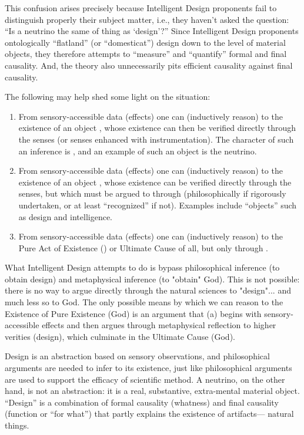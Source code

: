 This confusion arises precisely because Intelligent Design proponents fail to distinguish properly their subject matter, i.e., they haven't asked the question: ``Is a neutrino the same  of thing as `design'?'' Since Intelligent Design proponents ontologically ``flatland'' (or ``domesticat'') design down to the level of material objects, they therefore attempts to ``measure'' and ``quantify'' formal and final causality. And, the theory also unnecessarily pits efficient causality against final causality.

The following may help shed some light on the situation:
\begin{enumerate}
\item From sensory-accessible data (effects) one can  (inductively reason) to the existence of an object , whose existence can then be verified directly through the senses (or senses enhanced with instrumentation). The character of such an inference is , and an example of such an object is the neutrino.
\item From sensory-accessible data (effects) one can  (inductively reason) to the existence of an object , whose existence can  be verified directly through the senses, but which must be argued to through  (philosophically if rigorously undertaken, or at least ``recognized'' if not). Examples include ``objects'' such as design and intelligence.
\item From sensory-accessible data (effects) one can  (inductively reason) to the Pure Act of Existence () or Ultimate Cause of all, but only through .
\end{enumerate}

What Intelligent Design attempts to do is bypass philosophical inference (to obtain design) and metaphysical inference (to "obtain" God). This is not possible: there is no way to argue directly through the natural sciences to "design"... and much less so to God. The only possible means by which we can reason to the Existence of Pure Existence (God) is an argument that (a) begins with sensory-accessible effects and then argues through metaphysical reflection to higher verities (design), which culminate in the Ultimate Cause (God).

Design is an abstraction based on sensory observations, and philosophical arguments are needed to infer to its existence, just like philosophical arguments are used to support the efficacy of scientific method. A neutrino, on the other hand, is not an abstraction: it is a real, substantive, extra-mental material object. ``Design'' is a combination of formal causality (whatness) and final causality (function or ``for what'') that partly explains the existence of artifacts--- natural things.

